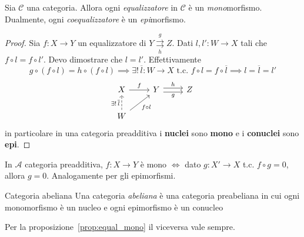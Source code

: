\begin{proposition}{}\label{prop:equal_mono}
    Sia \(\mathcal{C}\) una categoria. Allora ogni
    \emph{equalizzatore} in \(\mathcal{C}\) è un \emph{mono}morfismo.
    Dualmente, ogni \emph{coequalizzatore} è un \emph{epi}morfismo.
\end{proposition}
\begin{proof}{}
    Sia \(f : X \to Y\) un equalizzatore di \(Y \underset{h}{\overset{g}{\rightrightarrows}} Z\). Dati \(l, l' : W \to X\) tali che \(f \circ l = f \circ l'\). Devo dimostrare che \(l = l'\). 
    Effettivamente
    \[
      g \circ {(f \circ l)} = h \circ {(f \circ l)} \implies \exists ! \, \overline{l} : W \to X \text{ t.c. } f \circ l = f \circ \overline{l} \implies l = \overline{l} = l'
    \]
\[\begin{tikzcd}
	X & Y & Z \\
	W
	\arrow["f", from=1-1, to=1-2]
	\arrow["g"', shift right, from=1-2, to=1-3]
	\arrow["h", shift left, from=1-2, to=1-3]
	\arrow["{\exists!\,\overline{l}}", dashed, from=2-1, to=1-1]
	\arrow["{f\circ l}"', from=2-1, to=1-2]
\end{tikzcd}\]
    in particolare in una categoria preadditiva i \textbf{nuclei} sono \textbf{mono} e i \textbf{conuclei} sono \textbf{epi}.
\end{proof}
\begin{remark}{}
    In \(\mathcal{A}\) categoria preadditiva, \(f : X \to Y\) è mono \(\iff\)
    dato \(g : X' \to X\) t.c. \(f \circ g = 0\), allora \(g = 0\). Analogamente
    per gli epimorfismi.
\end{remark}

\begin{definition}{Categoria abeliana}
    Una categoria \emph{abeliana} è una categoria preabeliana in cui ogni
    monomorfismo è un nucleo e ogni epimorfismo è un conucleo
\end{definition}
\begin{remark}{}
    Per la proposizione~\ref{prop:equal_mono} il viceversa vale sempre.
\end{remark}

